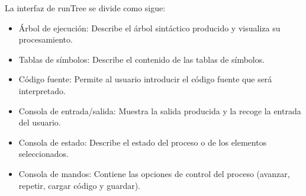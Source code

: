 La interfaz de runTree se divide como sigue:

\begin{itemize}
\item Árbol de ejecución: Describe el árbol sintáctico producido y visualiza su procesamiento.
\item Tablas de símbolos: Describe el contenido de las tablas de símbolos.
\item Código fuente: Permite al usuario introducir el código fuente que será interpretado.
\item Consola de entrada/salida: Muestra la salida producida y la recoge la entrada del usuario.
\item Consola de estado: Describe el estado del proceso o de los elementos seleccionados.
\item Consola de mandos: Contiene las opciones de control del proceso (avanzar, repetir, cargar código y guardar).
\end{itemize}

